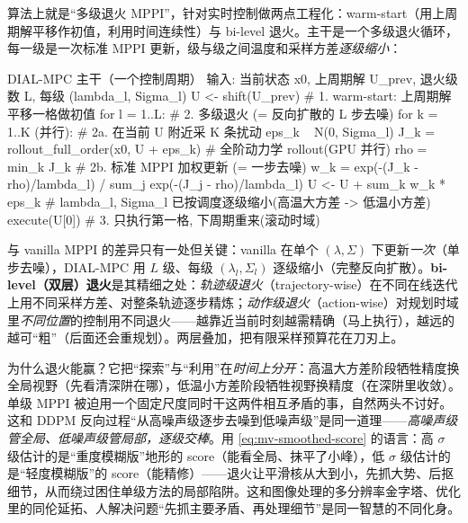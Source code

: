 \begin{algo}\label{alg:mv-dial}
算法上就是“多级退火 MPPI”，针对实时控制做两点工程化：warm-start（用上周期解平移作初值，利用时间连续性）与 bi-level 退火。主干是一个多级退火循环，每一级是一次标准 MPPI 更新，级与级之间温度和采样方差\emph{逐级缩小}：
\end{algo}

\begin{codebox}[text]{DIAL-MPC 主干（一个控制周期）}
输入: 当前状态 x0, 上周期解 U_prev, 退火级数 L, 每级 {(lambda_l, Sigma_l)}
U <- shift(U_prev)                       # 1. warm-start: 上周期解平移一格做初值
for l = 1..L:                            # 2. 多级退火 (= 反向扩散的 L 步去噪)
    for k = 1..K (并行):                 #    2a. 在当前 U 附近采 K 条扰动
        eps_k ~ N(0, Sigma_l)
        J_k = rollout_full_order(x0, U + eps_k)   # 全阶动力学 rollout(GPU 并行)
    rho = min_k J_k                      #    2b. 标准 MPPI 加权更新 (= 一步去噪)
    w_k = exp(-(J_k - rho)/lambda_l) / sum_j exp(-(J_j - rho)/lambda_l)
    U <- U + sum_k w_k * eps_k
    # lambda_l, Sigma_l 已按调度逐级缩小(高温大方差 -> 低温小方差)
execute(U[0])                            # 3. 只执行第一格, 下周期重来(滚动时域)
\end{codebox}

\noindent 与 vanilla MPPI 的差异只有一处但关键：vanilla 在单个 $(\lambda,\Sigma)$ 下更新\emph{一次}（单步去噪），DIAL-MPC 用 $L$ 级、每级 $(\lambda_l,\Sigma_l)$ 逐级缩小（完整反向扩散）。\textbf{bi-level（双层）退火}是其精细之处：\emph{轨迹级退火}（trajectory-wise）在不同在线迭代上用不同采样方差、对整条轨迹逐步精炼；\emph{动作级退火}（action-wise）对规划时域里\emph{不同位置}的控制用不同退火——越靠近当前时刻越需精确（马上执行），越远的越可“粗”（后面还会重规划）。两层叠加，把有限采样预算花在刀刃上。

\begin{insight}
为什么退火能赢？它把“探索”与“利用”在\emph{时间上分开}：高温大方差阶段牺牲精度换全局视野（先看清深阱在哪），低温小方差阶段牺牲视野换精度（在深阱里收敛）。单级 MPPI 被迫用一个固定尺度同时干这两件相互矛盾的事，自然两头不讨好。这和 DDPM 反向过程“从高噪声级逐步去噪到低噪声级”是同一道理——\emph{高噪声级管全局、低噪声级管局部，逐级交棒}。用 \cref{eq:mv-smoothed-score} 的语言：高 $\sigma$ 级估计的是“重度模糊版”地形的 score（能看全局、抹平了小峰），低 $\sigma$ 级估计的是“轻度模糊版”的 score（能精修）——退火让平滑核从大到小，先抓大势、后抠细节，从而绕过困住单级方法的局部陷阱。这和图像处理的多分辨率金字塔、优化里的同伦延拓、人解决问题“先抓主要矛盾、再处理细节”是同一智慧的不同化身。
\end{insight}

